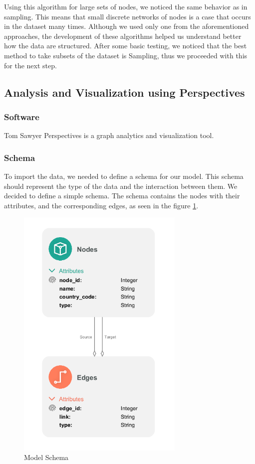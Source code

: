 \documentclass[sigconf, nonacm]{acmart}
\begin{document}
Using this algorithm for large sets of nodes, we noticed the same behavior as in sampling. This means that small discrete networks of nodes is a case that occurs in the dataset many times. Although we used only one from the aforementioned approaches, the development of these algorithms helped us understand better how the data are structured. After some basic testing, we noticed that the best method to take subsets of the dataset is Sampling, thus we proceeded with this for the next step.

\subsection{Analysis and Visualization using Perspectives}

\subsubsection{Software} 
Tom Sawyer Perspectives is a graph analytics and visualization tool.

\subsubsection{Schema} 
To import the data, we needed to define a schema for our model. This schema should represent the type of the data and the interaction between them. We decided to define a simple schema. The schema contains the nodes with their attributes, and the corresponding edges, as seen in the figure \ref{fig:schema}.
\begin{figure}[htp]
    \centering
    \includegraphics[width=8cm]{figures/schema.png}
    \caption{Model Schema}
    \label{fig:schema}
\end{figure}
\end{document}
